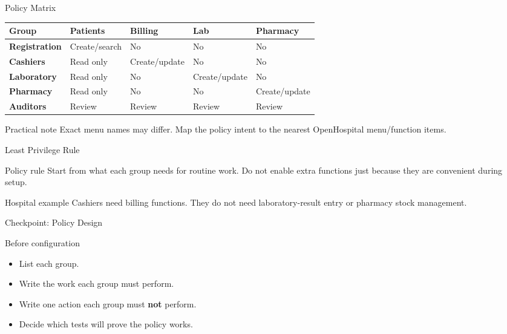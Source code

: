 \documentclass[presentation]{beamer}
\begin{document}
\begin{frame}[c]{Policy Matrix}
\begin{center}
\scriptsize
\renewcommand{\arraystretch}{1.15}
\begin{tabular}{@{}>{\bfseries}p{} p{} p{} p{} p{}@{}}
\toprule
Group & Patients & Billing & Lab & Pharmacy \\
\midrule
Registration & Create/search & No & No & No \\
Cashiers & Read only & Create/update & No & No \\
Laboratory & Read only & No & Create/update & No \\
Pharmacy & Read only & No & No & Create/update \\
Auditors & Review & Review & Review & Review \\
\bottomrule
\end{tabular}
\end{center}

\begin{block}{Practical note}
Exact menu names may differ. Map the policy intent to the nearest OpenHospital menu/function items.
\end{block}
\end{frame}

\begin{frame}[c]{Least Privilege Rule}
\begin{block}{Policy rule}
Start from what each group needs for routine work. Do not enable extra functions just because they
are convenient during setup.
\end{block}

\begin{exampleblock}{Hospital example}
Cashiers need billing functions. They do not need laboratory-result entry or pharmacy stock
management.
\end{exampleblock}
\end{frame}

\begin{frame}[c]{Checkpoint: Policy Design}
\begin{block}{Before configuration}
\begin{itemize}
    \item List each group.
    \item Write the work each group must perform.
    \item Write one action each group must \textbf{not} perform.
    \item Decide which tests will prove the policy works.
\end{itemize}
\end{block}
\end{frame}
\end{document}
